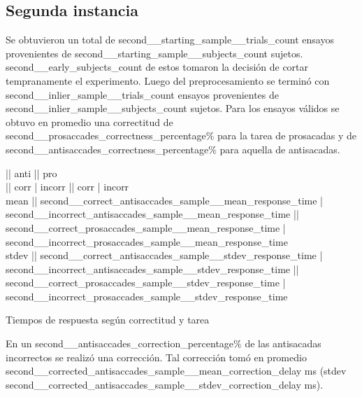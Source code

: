 \subsection{{Segunda instancia}}

Se obtuvieron un total de {second__starting_sample__trials_count} ensayos
provenientes de {second__starting_sample__subjects_count} sujetos.
{second__early_subjects_count} de estos tomaron la decisión de cortar
tempranamente el experimento.
Luego del preprocesamiento se terminó con {second__inlier_sample__trials_count}
ensayos provenientes de {second__inlier_sample__subjects_count} sujetos.
Para los ensayos válidos se obtuvo en promedio una correctitud de 
{second__prosaccades_correctness_percentage}$\%$ para la tarea de prosacadas y
de {second__antisaccades_correctness_percentage}$\%$ para aquella de
antisacadas.

\begin{{table}}[htb]
    \centering

              || anti            || pro             \\
              || corr   | incorr || corr   | incorr \\
        mean
          || {second__correct_antisaccades_sample__mean_response_time}
          | {second__incorrect_antisaccades_sample__mean_response_time}
          || {second__correct_prosaccades_sample__mean_response_time}
          | {second__incorrect_prosaccades_sample__mean_response_time} \\
        stdev
          || {second__correct_antisaccades_sample__stdev_response_time}
          | {second__incorrect_antisaccades_sample__stdev_response_time}
          || {second__correct_prosaccades_sample__stdev_response_time}
          | {second__incorrect_prosaccades_sample__stdev_response_time}

    \caption{{Tiempos de respuesta según correctitud y tarea}}
\end{{table}}

En un {second__antisaccades_correction_percentage}$\%$ de las antisacadas
incorrectos se realizó una corrección.
Tal corrección tomó en promedio
{second__corrected_antisaccades_sample__mean_correction_delay} ms (stdev
{second__corrected_antisaccades_sample__stdev_correction_delay} ms).


